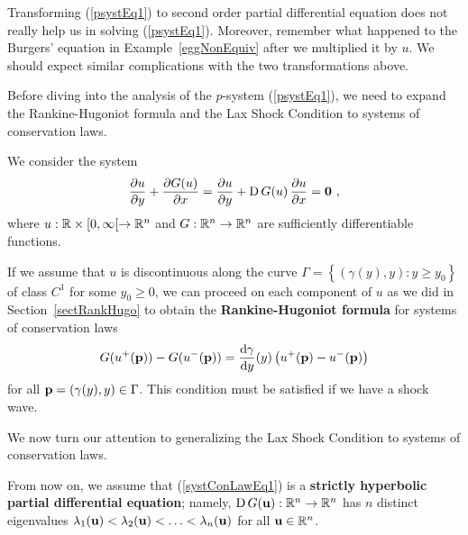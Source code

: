 \begin{egg}
Transforming (\ref{psystEq1}) to second order partial differential
equation does not really help us in solving (\ref{psystEq1}).
Moreover, remember what happened to the Burgers' equation in
Example~\ref{eggNonEquiv} after we multiplied it by $u$.  We should
expect similar complications with the two transformations above.
\end{egg}

Before diving into the analysis of the $p$-system
(\ref{psystEq1}), we need to expand the Rankine-Hugoniot formula
and the Lax Shock Condition to systems of conservation laws.

We consider the system
\begin{equation} \label{systConLawEq1}
\frac{\partial{u}}{\partial y} + \frac{\partial{G(u)}}{\partial x}
= \frac{\partial{u}}{\partial y} + \operatorname{D} G(u) \, \frac{\partial{u}}{\partial x} = \mathbf{0} \ ,
\end{equation}
where $u:\mathbb{R}\times [0,\infty[ \to \mathbb{R}^n$ and $G:\mathbb{R}^n \to \mathbb{R}^n$
are sufficiently differentiable functions.

If we assume that $u$ is discontinuous along the curve
$\displaystyle \Gamma = \left\{ (\gamma(y),y) : y \geq y_0 \right\}$
of class $\displaystyle C^1$ for some $y_0 \geq 0$, we can proceed on
each component of $u$ as we did in Section~\ref{sectRankHugo} to obtain the
{\bfseries Rankine-Hugoniot formula}
for systems of conservation laws
\begin{equation}\label{shock_rank_hugND}
G(u^+(\mathbf{p}))-G(u^-(\mathbf{p}))
= \frac{\mathrm{d}\gamma}{\mathrm{d}{y}}(y) \left(u^+(\mathbf{p}) - u^-(\mathbf{p}) \right)
\end{equation}
for all $\mathbf{p}=(\gamma(y),y) \in \Gamma$.  This condition must be
satisfied if we have a shock wave.

We now turn our attention to generalizing the Lax Shock Condition
to systems of conservation laws.

From now on, we assume that (\ref{systConLawEq1}) is a
{\bfseries strictly hyperbolic partial differential
equation};
namely, $\operatorname{D} G(\mathbf{u}) :\mathbb{R}^n \to \mathbb{R}^n$ has $n$ distinct eigenvalues
$\lambda_1(\mathbf{u}) < \lambda_2(\mathbf{u}) < \ldots < \lambda_n(\mathbf{u})$
for all $\mathbf{u} \in \mathbb{R}^n$.

